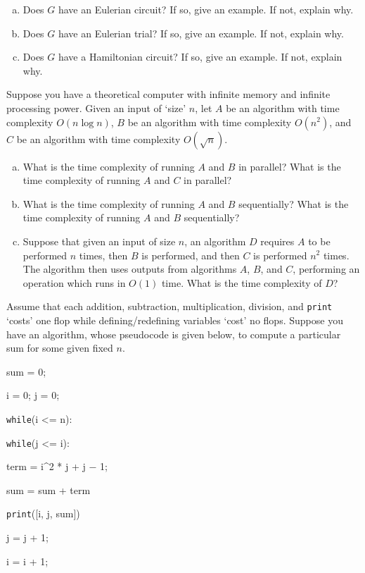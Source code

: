 \documentclass[12pt,letterpaper]{exam}
\begin{document}
\begin{questions}
\begin{enumerate}[(a)]
\item Does $G$ have an Eulerian circuit? If so, give an example. If not, explain why.
\item Does $G$ have an Eulerian trial? If so, give an example. If not, explain why. 
\item Does $G$ have a Hamiltonian circuit? If so, give an example. If not, explain why. 
\end{enumerate}



\newpage
\question[10] Suppose you have a theoretical computer with infinite memory and infinite processing power. Given an input of `size' $n$, let $A$ be an algorithm with time complexity $O(n \log n)$, $B$ be an algorithm with time complexity $O(n^2)$, and $C$ be an algorithm with time complexity $O(\sqrt{n})$. 
	\begin{enumerate}[(a)]
	\item What is the time complexity of running $A$ and $B$ in parallel? What is the time complexity of running $A$ and $C$ in parallel?
	\item What is the time complexity of running $A$ and $B$ sequentially? What is the time complexity of running $A$ and $B$ sequentially?
	\item Suppose that given an input of size $n$, an algorithm $D$ requires $A$ to be performed $n$ times, then $B$ is performed, and then $C$ is performed $n^2$ times. The algorithm then uses outputs from algorithms $A$, $B$, and $C$, performing an operation which runs in $O(1)$ time. What is the time complexity of $D$?	
	\end{enumerate}



\newpage
\question[10] Assume that each addition, subtraction, multiplication, division, and \texttt{print} `costs' one flop while defining/redefining variables `cost' no flops. Suppose you have an algorithm, whose pseudocode is given below, to compute a particular sum for some given fixed $n$.

\hspace{1cm} sum = 0; \par
\hspace{1cm} i = 0; j = 0; \par
\hspace{1cm} \texttt{while}(i <= n): \par
\hspace{1.5cm}	 \texttt{while}(j <= i): \par
\hspace{2cm}	term = i\^{}2 * j + j $-$ 1; \par
\hspace{2cm}	sum = sum + term \par
\hspace{2cm}	\texttt{print}([i, j, sum]) \par
\hspace{2cm} j = j + 1; \par
\hspace{1cm} i = i + 1;


\end{questions}
\end{document}
